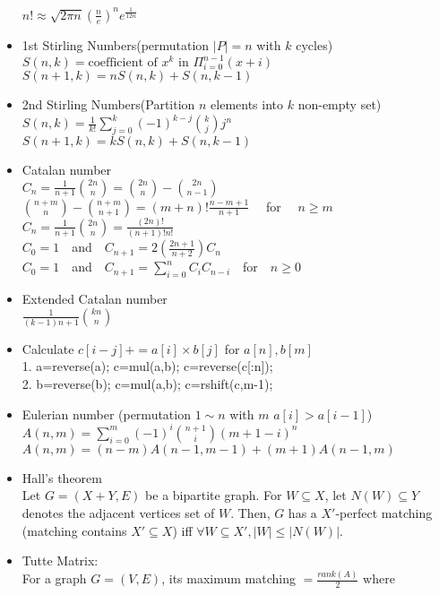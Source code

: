 \begin{itemize}
    $n!\approx\sqrt{ 2 \pi n}(\frac{n}{e})^{n}e^\frac{1}{12n}$
  \item 1st Stirling Numbers(permutation $|P|=n$ with $k$ cycles)\\
    $S(n,k) = \text{coefficient of }x^k \text{ in } \Pi_{i=0}^{n-1} (x+i)$ \\
    $S(n+1,k) = nS(n,k)+S(n,k-1)$
  \item 2nd Stirling Numbers(Partition $n$ elements into $k$ non-empty set)\\
    $S(n,k) = \frac{1}{k!} \sum\limits_{j=0}^k (-1)^{k-j} {k \choose j} j^n$ \\
    $S(n+1,k) = kS(n,k)+S(n,k-1)$
  \item Catalan number\\
    $C_n = \frac{1}{n+1}{2n \choose n} = {2n \choose n} - {2n \choose n - 1}$\\
    ${n+m \choose n}-{n+m \choose n+1} = (m+n)! \frac{n-m+1}{n+1}\quad$ for $\quad  n \ge m$\\
    $C_n = \frac{1}{n+1}{2n \choose n} = \frac{(2n)!}{(n+1)!n!}$\\
    $C_0 = 1 \quad  $and$ \quad C_{n+1}= 2(\frac{2n+1}{n+2})C_n$\\
    $C_0 = 1 \quad  $and$ \quad C_{n+1} = \sum_{i=0}^{n} C_iC_{n-i} \quad $for$ \quad  n \ge 0$
  \item Extended Catalan number\\
    $\frac{1}{(k-1)n+1} {kn\choose n}$
  \item Calculate $c[i-j]+=a[i]\times b[j]$ for $a[n],b[m]$ \\
    1. a=reverse(a); c=mul(a,b); c=reverse(c[:n]); \\
    2. b=reverse(b); c=mul(a,b); c=rshift(c,m-1); 
  \item Eulerian number (permutation $1\sim n$ with $m$ $a[i]>a[i-1]$)\\
    $A(n,m)=\sum\limits_{i=0}^{m}(-1)^i {n+1\choose i} (m+1-i)^n $ \\
    $A(n,m)=(n-m)A(n-1,m-1)+(m+1)A(n-1,m)$
  \item Hall's theorem\\
    Let $G=(X+Y,E)$ be a bipartite graph. For $W\subseteq X$, let $N(W)\subseteq Y$ denotes the adjacent vertices set of $W$. Then, $G$ has a $X'$-perfect matching (matching contains $X'\subseteq X$) iff $\forall W\subseteq X', |W|\le|N(W)|$.
  \item Tutte Matrix:\\
    For a graph $G=(V,E)$, its maximum matching $=\frac{rank(A)}{2}$ where\\

\end{itemize}
